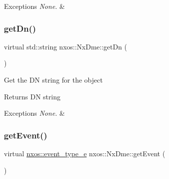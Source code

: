 \begin{DoxyExceptions}{Exceptions}
{\em None.} & \\
\hline
\end{DoxyExceptions}
\mbox{\label{classnxos_1_1_nx_dme_ad97ecb092308dcacdd5de64327742210}} 
\subsubsection{\texorpdfstring{get\+Dn()}{getDn()}}
{\footnotesize\ttfamily virtual std\+::string nxos\+::\+Nx\+Dme\+::get\+Dn (\begin{DoxyParamCaption}{ }\end{DoxyParamCaption})\hspace{0.3cm}{\ttfamily [pure virtual]}}

Get the DN string for the object \begin{DoxyReturn}{Returns}
DN string 

\end{DoxyReturn}

\begin{DoxyExceptions}{Exceptions}
{\em None.} & \\
\hline
\end{DoxyExceptions}
\mbox{\label{classnxos_1_1_nx_dme_aff302a3891e0b6f69e9e0fd26e6e16a7}} 
\subsubsection{\texorpdfstring{get\+Event()}{getEvent()}}
{\footnotesize\ttfamily virtual \mbox{\hyperlink{namespacenxos_af9a9040b7681199d386e94eb888018cb}{nxos\+::event\+\_\+type\+\_\+e}} nxos\+::\+Nx\+Dme\+::get\+Event (\begin{DoxyParamCaption}{ }\end{DoxyParamCaption})\hspace{0.3cm}{\ttfamily [pure virtual]}}

